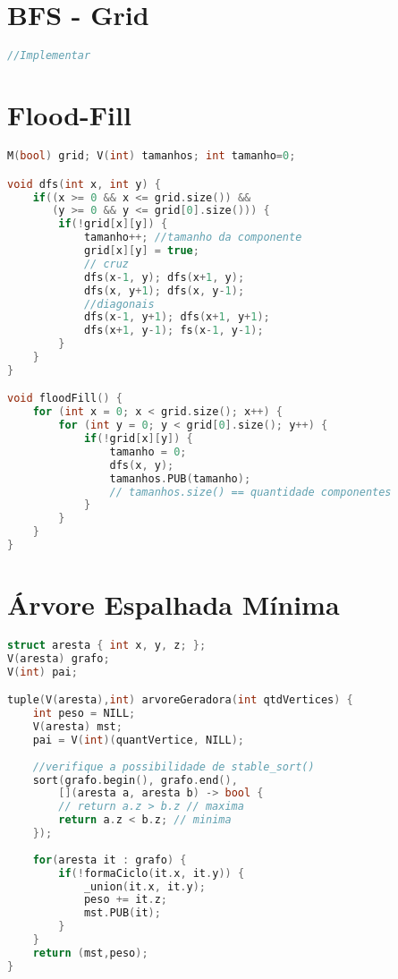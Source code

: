 \section{BFS - Grid}
\begin{lstlisting}[language=C++]
//Implementar
\end{lstlisting}

\newpage

\section{Flood-Fill}
\begin{lstlisting}[language = C++]
M(bool) grid; V(int) tamanhos; int tamanho=0;

void dfs(int x, int y) {
	if((x >= 0 && x <= grid.size()) && 
       (y >= 0 && y <= grid[0].size())) {
    	if(!grid[x][y]) {
            tamanho++; //tamanho da componente
            grid[x][y] = true;
            // cruz
            dfs(x-1, y); dfs(x+1, y);
            dfs(x, y+1); dfs(x, y-1);
            //diagonais
            dfs(x-1, y+1); dfs(x+1, y+1);
            dfs(x+1, y-1); fs(x-1, y-1);
        }
    }
}

void floodFill() {
    for (int x = 0; x < grid.size(); x++) {
    	for (int y = 0; y < grid[0].size(); y++) {
    		if(!grid[x][y]) {
            	tamanho = 0;
    			dfs(x, y);
                tamanhos.PUB(tamanho);
                // tamanhos.size() == quantidade componentes
    		}
    	}
    }
}
\end{lstlisting}

\newpage
\section{Árvore Espalhada Mínima}
\begin{lstlisting}[language=C++, title={Algoritmo de Kruskal}]
struct aresta { int x, y, z; };
V(aresta) grafo;
V(int) pai;

tuple(V(aresta),int) arvoreGeradora(int qtdVertices) {
	int peso = NILL;
    V(aresta) mst;
	pai = V(int)(quantVertice, NILL);
    
    //verifique a possibilidade de stable_sort()
    sort(grafo.begin(), grafo.end(), 
    	[](aresta a, aresta b) -> bool {
    	// return a.z > b.z // maxima
        return a.z < b.z; // minima
    });
    
	for(aresta it : grafo) {
		if(!formaCiclo(it.x, it.y)) {
			_union(it.x, it.y);
			peso += it.z;
            mst.PUB(it);
		}
	}
	return (mst,peso);
}
\end{lstlisting}

